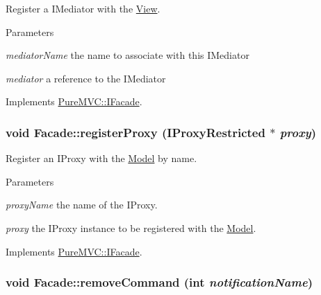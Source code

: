 Register a {\ttfamily IMediator} with the {\ttfamily \hyperlink{class_pure_m_v_c_1_1_view}{View}}. 
\begin{DoxyParams}{Parameters}
\item[{\em mediatorName}]the name to associate with this {\ttfamily IMediator} \item[{\em mediator}]a reference to the {\ttfamily IMediator} \end{DoxyParams}


Implements \hyperlink{class_pure_m_v_c_1_1_i_facade_af6849105c64d8841afce1cf7bb2b4d84}{PureMVC::IFacade}.\hypertarget{class_pure_m_v_c_1_1_facade_ab075d59d3da686f0262900f4e19f22cd}{
\subsubsection[{registerProxy}]{\setlength{\rightskip}{0pt plus 5cm}void Facade::registerProxy ({\bf IProxyRestricted} $\ast$ {\em proxy})}}
\label{class_pure_m_v_c_1_1_facade_ab075d59d3da686f0262900f4e19f22cd}


Register an {\ttfamily IProxy} with the {\ttfamily \hyperlink{class_pure_m_v_c_1_1_model}{Model}} by name. 
\begin{DoxyParams}{Parameters}
\item[{\em proxyName}]the name of the {\ttfamily IProxy}. \item[{\em proxy}]the {\ttfamily IProxy} instance to be registered with the {\ttfamily \hyperlink{class_pure_m_v_c_1_1_model}{Model}}. \end{DoxyParams}


Implements \hyperlink{class_pure_m_v_c_1_1_i_facade_a510b704a75bb052bbccd816ac30a5df0}{PureMVC::IFacade}.\hypertarget{class_pure_m_v_c_1_1_facade_aa99976fe908bef0b08642906b02e2af3}{
\subsubsection[{removeCommand}]{\setlength{\rightskip}{0pt plus 5cm}void Facade::removeCommand (int {\em notificationName})}}
\label{class_pure_m_v_c_1_1_facade_aa99976fe908bef0b08642906b02e2af3}


